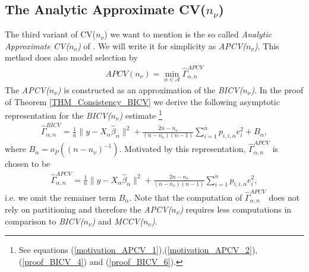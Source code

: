 \documentclass[Research_Module_ES.tex]{subfiles}
\begin{document}
\subsection{The Analytic Approximate CV($n_\nu$)}
The third variant of CV($n_\nu$) we want to mention is the so called \textit{Analytic Approximate CV($n_\nu$)} of \cite{shao}. We will write it for simplicity as \textit{APCV($n_\nu$)}. This method does also model selection by 
\begin{align*}
APCV(n_\nu)=\min_{\alpha\in\mathcal{A}}\hat{\Gamma}_{\alpha,n}^{APCV}
\end{align*}
The \textit{APCV($n_\nu$)} is constructed as an approximation of the \textit{BICV($n_\nu$)}. In the proof of Theorem \ref{THM_Consistency_BICV} we derive the following asymptotic representation for the \textit{BICV($n_\nu$)} estimate
\footnote{See equations (\ref{motivation_APCV_1}),(\ref{motivation_APCV_2}),(\ref{proof_BICV_4}) and (\ref{proof_BICV_6}).}
\begin{align*}
\hat{\Gamma}_{\alpha,n}^{BICV}=\frac{1}{n}\lVert y-X_\alpha\hat{\beta}_\alpha\rVert^2 + \frac{2n-n_v}{(n-n_v)(n-1)}\sum_{i=1}^np_{i,i,\alpha}e_i^2 + B_\alpha,
\end{align*}
where $B_\alpha = o_P((n-n_\nu)^{-1})$. 
Motivated by this representation, $\hat{\Gamma}_{\alpha,n}^{APCV}$ is chosen to be
\begin{align*}
\hat{\Gamma}_{\alpha,n}^{APCV}=\frac{1}{n}\lVert y-X_\alpha\hat{\beta}_\alpha\rVert^2 + \frac{2n-n_v}{(n-n_v)(n-1)}\sum_{i=1}^np_{i,i,\alpha}e_i^2,
\end{align*}
i.e. we omit the remainer term $B_\alpha$.
Note that the computation of $\hat{\Gamma}_{\alpha,n}^{APCV}$ does not rely on partitioning and therefore the \textit{APCV($n_\nu$)} requires less computations in comparison to \textit{BICV($n_\nu$)} and \textit{MCCV($n_\nu$)}.
\end{document}
